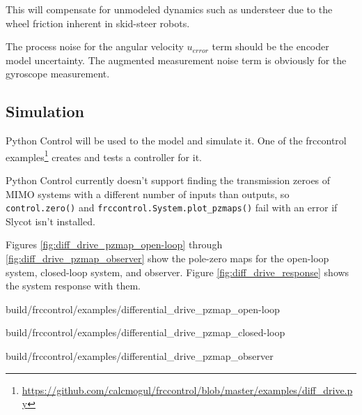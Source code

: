 This will compensate for unmodeled dynamics such as understeer due to the wheel
friction inherent in skid-steer robots.

\begin{remark}
  The process noise for the angular velocity $u_{error}$ term should be the
  encoder \gls{model} uncertainty. The augmented measurement noise term is
  obviously for the gyroscope measurement.
\end{remark}

\subsection{Simulation}

Python Control will be used to  the
\gls{model} and simulate it. One of the frccontrol
examples\footnote{\url{https://github.com/calcmogul/frccontrol/blob/master/examples/diff_drive.py}}
creates and tests a controller for it.

\begin{remark}
  Python Control currently doesn't support finding the transmission zeroes of
  MIMO \glspl{system} with a different number of \glspl{input} than
  \glspl{output}, so \texttt{control.zero()} and
  \texttt{frccontrol.System.plot\_pzmaps()} fail with an error if Slycot isn't
  installed.
\end{remark}

Figures \ref{fig:diff_drive_pzmap_open-loop} through
\ref{fig:diff_drive_pzmap_observer} show the pole-zero maps for the open-loop
\gls{system}, closed-loop \gls{system}, and \gls{observer}. Figure
\ref{fig:diff_drive_response} shows the \gls{system} response with them.

\begin{bookfigure}
  \begin{minisvg}{3}{build/frccontrol/examples/differential_drive_pzmap_open-loop}
    \caption{Drivetrain open-loop pole-zero map}
    \label{fig:diff_drive_pzmap_open-loop}
  \end{minisvg}
  \hfill
  \begin{minisvg}{3}{build/frccontrol/examples/differential_drive_pzmap_closed-loop}
    \caption{Drivetrain closed-loop pole-zero map}
    \label{fig:diff_drive_pzmap_closed-loop}
  \end{minisvg}
  \hfill
  \begin{minisvg}{3}{build/frccontrol/examples/differential_drive_pzmap_observer}
    \caption{Drivetrain observer pole-zero map}
    \label{fig:diff_drive_pzmap_observer}
  \end{minisvg}
\end{bookfigure}

